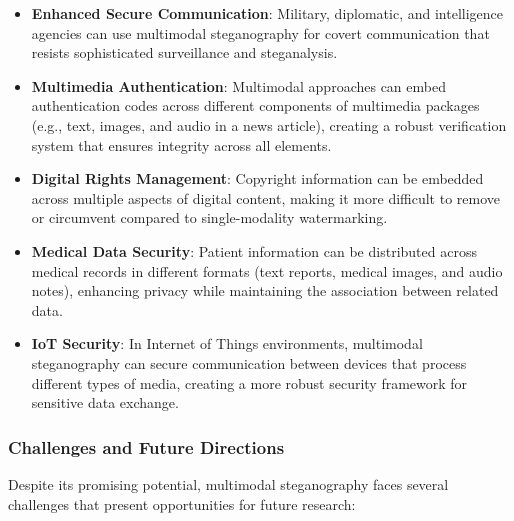 \documentclass[12pt, a4paper, oneside]{book}
\begin{document}
\begin{itemize}[leftmargin=*]
    \item \textbf{Enhanced Secure Communication}: Military, diplomatic, and intelligence agencies can use multimodal steganography for covert communication that resists sophisticated surveillance and steganalysis.

    \item \textbf{Multimedia Authentication}: Multimodal approaches can embed authentication codes across different components of multimedia packages (e.g., text, images, and audio in a news article), creating a robust verification system that ensures integrity across all elements.

    \item \textbf{Digital Rights Management}: Copyright information can be embedded across multiple aspects of digital content, making it more difficult to remove or circumvent compared to single-modality watermarking.

    \item \textbf{Medical Data Security}: Patient information can be distributed across medical records in different formats (text reports, medical images, and audio notes), enhancing privacy while maintaining the association between related data.

    \item \textbf{IoT Security}: In Internet of Things environments, multimodal steganography can secure communication between devices that process different types of media, creating a more robust security framework for sensitive data exchange.
\end{itemize}

\subsubsection{Challenges and Future Directions}
Despite its promising potential, multimodal steganography faces several challenges that present opportunities for future research:
\end{document}
